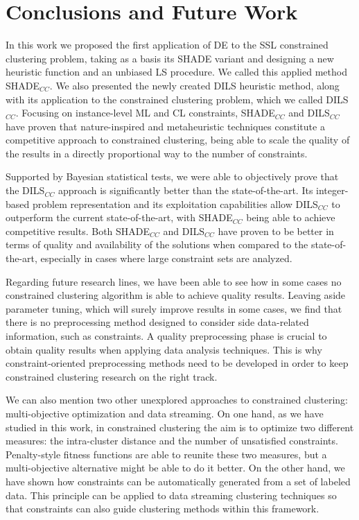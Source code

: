 \chapter{Conclusions and Future Work}\label{ch:ConclFW}


In this work we proposed the first application of \acf{DE} to the \acf{SSL} constrained clustering problem, taking as a basis its \acf{SHADE} variant and designing a new heuristic function and an unbiased \acf{LS} procedure. We called this applied method \acs{SHADE}$_{CC}$. We also presented the newly created \acf{DILS} heuristic method, along with its application to the constrained clustering problem, which we called \acs{DILS}$_{CC}$. Focusing on instance-level \acf{ML} and \acf{CL} constraints, \acs{SHADE}$_{CC}$ and \acs{DILS}$_{CC}$ have proven that nature-inspired and metaheuristic techniques constitute a competitive approach to constrained clustering, being able to scale the quality of the results in a directly proportional way to the number of constraints.  

Supported by Bayesian statistical tests, we were able to objectively prove that the \acs{DILS}$_{CC}$ approach is significantly better than the state-of-the-art. Its integer-based problem representation and its exploitation capabilities allow \acs{DILS}$_{CC}$ to outperform the current state-of-the-art, with \acs{SHADE}$_{CC}$ being able to achieve competitive results. Both \acs{SHADE}$_{CC}$ and \acs{DILS}$_{CC}$ have proven to be better in terms of quality and availability of the solutions when compared to the state-of-the-art, especially in cases where large constraint sets are analyzed.

Regarding future research lines, we have been able to see how in some cases no constrained clustering algorithm is able to achieve quality results. Leaving aside parameter tuning, which will surely improve results in some cases, we find that there is no preprocessing method designed to consider side data-related information, such as constraints. A quality preprocessing phase is crucial to obtain quality results when applying data analysis techniques. This is why constraint-oriented preprocessing methods need to be developed in order to keep constrained clustering research on the right track.

We can also mention two other unexplored approaches to constrained clustering: multi-objective optimization and data streaming. On one hand, as we have studied in this work, in constrained clustering the aim is to optimize two different measures: the intra-cluster distance and the number of unsatisfied constraints. Penalty-style fitness functions are able to reunite these two measures, but a multi-objective alternative might be able to do it better. On the other hand, we have shown how constraints can be automatically generated from a set of labeled data. This principle can be applied to data streaming clustering techniques so that constraints can also guide clustering methods within this framework.














